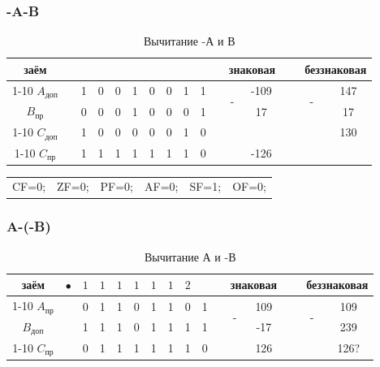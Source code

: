 \subsubsection{-A-B}

\begin{table}[H]
    \centering
    \caption{Вычитание -А и В}
    \begin{tabular}{c|cc|cccccccp{1cm}ccp{0.5cm}cc}
		\small заём & & & & & & & & & & & \multicolumn{2}{c}{знаковая} & \  & \multicolumn{2}{c}{беззнаковая}  \\
		\cline{1-10} \cline{12-13} \cline{15-16}
		$A_{\text{доп}}$ & & 1 & 0 & 0 & 1 & 0 & 0 & 1 & 1 & & \multirow{2}{*}{-} & -109 & \  & \multirow{2}{*}{-} & 147  \\
		$B_{\text{пр}}$ & & 0 & 0 & 0 & 1 & 0 & 0 & 0 & 1 & & & 17 & \  &  & 17 \\
		\cline{1-10} \cline{12-13} \cline{15-16}
		$C_{\text{доп}}$ & & 1 & 0 & 0 & 0 & 0 & 0 & 1 & 0 & & & & \  &  & 130 \\
		\cline{1-10} \cline{12-13} \cline{15-16}
		$C_{\text{пр}}$ & & 1 & 1 & 1 & 1 & 1 & 1 & 1 & 0 & & & -126 & \  &  & 
    \end{tabular}
\end{table}

\begin{table}[H]
    \centering
    \begin{tabular}{cccccc}
        CF=0; & ZF=0; & PF=0; & AF=0; & SF=1; & OF=0;
    \end{tabular}
\end{table}


\subsubsection{A-(-B)}

\begin{table}[H]
    \centering
    \caption{Вычитание А и -В}
    \begin{tabular}{c|cc|cccccccp{1cm}ccp{0.5cm}cc}
		\small заём & $\bullet$ & $1$ & $1$ & $1$ & $1$ & $1$ & $1$ & $2$ & & & \multicolumn{2}{c}{знаковая} & \  & \multicolumn{2}{c}{беззнаковая}  \\
		\cline{1-10} \cline{12-13} \cline{15-16}
		$A_{\text{пр}}$ & & 0 & 1 & 1 & 0 & 1 & 1 & 0 & 1 & & \multirow{2}{*}{-} & 109 & \  & \multirow{2}{*}{-} & 109   \\
		$B_{\text{доп}}$ & & 1 & 1 & 1 & 0 & 1 & 1 & 1 & 1 & & & -17 & \  &  & 239 \\
		\cline{1-10} \cline{12-13} \cline{15-16}
		$C_{\text{пр}}$ & & 0 & 1 & 1 & 1 & 1 & 1 & 1 & 0 & & & 126 & \  &  & 126? \\
    \end{tabular}
\end{table}

